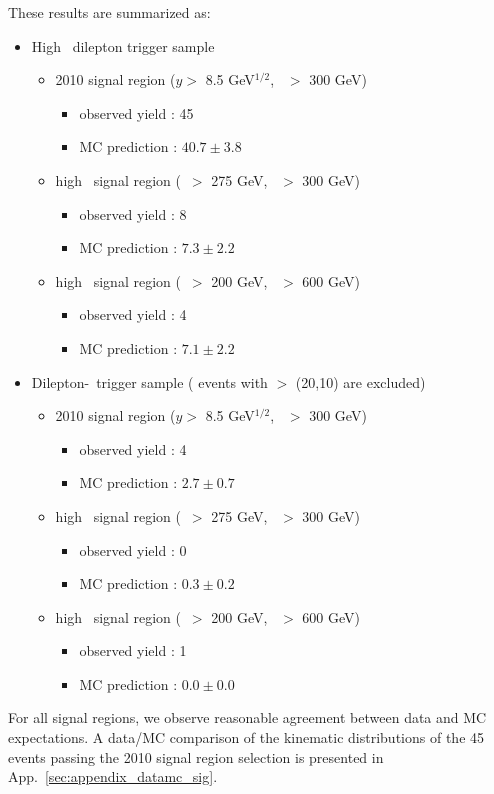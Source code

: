 \clearpage

These results are summarized as:

\begin{itemize}
\item High \pt\ dilepton trigger sample
\begin{itemize}
\item 2010 signal region ($y >$ 8.5 GeV$^{1/2}$, \Ht\ $>$ 300 GeV)
   \begin{itemize} 
   \item observed yield : 45 
   \item MC prediction  : $40.7 \pm 3.8$
   \end{itemize}  
\item high \met\ signal region (\met\ $>$ 275 GeV, \Ht\ $>$ 300 GeV)
   \begin{itemize} 
   \item observed yield : 8 
   \item MC prediction  : $7.3 \pm 2.2$
   \end{itemize}  
\item high \Ht\ signal region (\met\ $>$ 200 GeV, \Ht\ $>$ 600 GeV)
   \begin{itemize} 
   \item observed yield : 4 
   \item MC prediction  : $7.1 \pm 2.2$
   \end{itemize}  
\end{itemize}

\item Dilepton-\Ht\ trigger sample ( events with \pt $>$ (20,10) are excluded)
\begin{itemize}
\item 2010 signal region ($y >$ 8.5 GeV$^{1/2}$, \Ht\ $>$ 300 GeV)
   \begin{itemize} 
   \item observed yield : 4
   \item MC prediction  : $2.7 \pm 0.7$
   \end{itemize}  
\item high \met\ signal region (\met\ $>$ 275 GeV, \Ht\ $>$ 300 GeV)
   \begin{itemize} 
   \item observed yield : 0 
   \item MC prediction  : $0.3 \pm 0.2$
   \end{itemize}  
\item high \Ht\ signal region (\met\ $>$ 200 GeV, \Ht\ $>$ 600 GeV)
   \begin{itemize} 
   \item observed yield : 1 
   \item MC prediction  : $0.0 \pm 0.0$
   \end{itemize}  
\end{itemize}
\end{itemize}

For all signal regions, we observe reasonable agreement between data and MC expectations. 
A data/MC comparison of the kinematic distributions of the 45 events passing
the 2010 signal region selection is presented in App.~\ref{sec:appendix_datamc_sig}.

